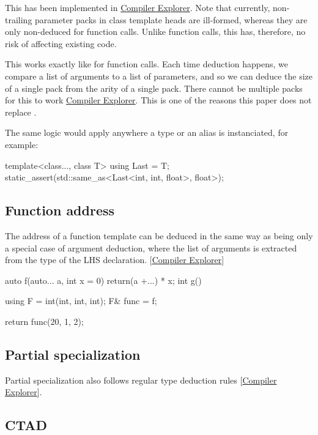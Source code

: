 \documentclass{wg21}
\begin{document}
This has been implemented in \href{https://godbolt.org/z/9zs3KEWWx}{Compiler Explorer}.
Note that currently, non-trailing parameter packs in class template heads are ill-formed, whereas they are only non-deduced for function calls.
Unlike function calls, this has, therefore, no risk of affecting existing code.

This works exactly like for function calls.
Each time deduction happens, we compare a list of arguments to a list of parameters, and so we can deduce the size of a single pack
from the arity of a single pack.
There cannot be multiple packs for this to work \href{https://godbolt.org/z/rTjhdYrY6}{Compiler Explorer}.
This is one of the reasons this paper does not replace .

The same logic would apply anywhere a type or an alias is instanciated, for example:

\begin{colorblock}
template<class..., class T>
using  Last = T;
static_assert(std::same_as<Last<int, int, float>, float>);
\end{colorblock}

\subsection{Function address}

The address of a function template can be deduced in the same way as being only a special case of argument deduction,
where the list of arguments is extracted from the type of the LHS declaration.
[\href{https://godbolt.org/z/d68bxfPWT}{Compiler Explorer}]

\begin{colorblock}
auto f(auto... a, int x = 0) {
    return(a +...) * x;
}
int g() {
    using F = int(int, int, int);
    F& func = f;

    return func(20, 1, 2);
}
\end{colorblock}


\subsection{Partial specialization}

Partial specialization also follows regular type deduction rules
[\href{https://godbolt.org/z/18znK877c}{Compiler Explorer}].

\subsection{CTAD}
\end{document}
